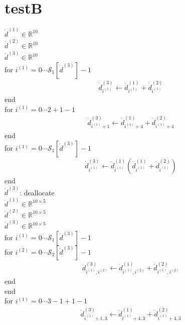 \documentclass[a4paper,fleqn]{ltjsarticle}
\begin{document}
\section{testB}
  $\dot{d}^{(1)} \in \mathbb{R}^{10}$\\
  $\dot{d}^{(2)} \in \mathbb{R}^{10}$\\
  $\dot{d}^{(3)} \in \mathbb{R}^{10}$\\
  for $i^{(1)}=0\cdots \mathcal{S}_1[\dot{d}^{(3)}]-1$\\
    \begin{align}
    \dot{d}^{(3)}_{i^{(1)}} \leftarrow \dot{d}^{(1)}_{i^{(1)}}+\dot{d}^{(2)}_{i^{(1)}}
    \end{align}
  end\\
  for $i^{(1)}=0\cdots 2+1-1$\\
    \begin{align}
    \dot{d}^{(3)}_{i^{(1)}+1} \leftarrow \dot{d}^{(1)}_{i^{(1)}+4}+\dot{d}^{(2)}_{i^{(1)}+4}
    \end{align}
  end\\
  for $i^{(1)}=0\cdots \mathcal{S}_1[\dot{d}^{(3)}]-1$\\
    \begin{align}
    \dot{d}^{(3)}_{i^{(1)}} \leftarrow \dot{d}^{(1)}_{i^{(1)}} \left(\dot{d}^{(1)}_{i^{(1)}}+\dot{d}^{(2)}_{i^{(1)}}\right)
    \end{align}
  end\\
  $\dot{d}^{(3)}$: deallocate\\
  $\ddot{d}^{(1)} \in \mathbb{R}^{10\times5}$\\
  $\ddot{d}^{(2)} \in \mathbb{R}^{10\times5}$\\
  $\ddot{d}^{(3)} \in \mathbb{R}^{10\times5}$\\
  for $i^{(1)}=0\cdots \mathcal{S}_1[\ddot{d}^{(3)}]-1$\\
    for $i^{(2)}=0\cdots \mathcal{S}_2[\ddot{d}^{(3)}]-1$\\
      \begin{align}
      \ddot{d}^{(3)}_{i^{(1)},i^{(2)}} \leftarrow \ddot{d}^{(1)}_{i^{(1)},i^{(2)}}+\ddot{d}^{(2)}_{i^{(1)},i^{(2)}}
      \end{align}
    end\\
  end\\
  for $i^{(1)}=0\cdots 3-1+1-1$\\
    \begin{align}
    \ddot{d}^{(3)}_{i^{(1)}+1,3} \leftarrow \ddot{d}^{(1)}_{i^{(1)}+4,3}+\ddot{d}^{(2)}_{i^{(1)}+4,3}
    \end{align}
\end{document}
